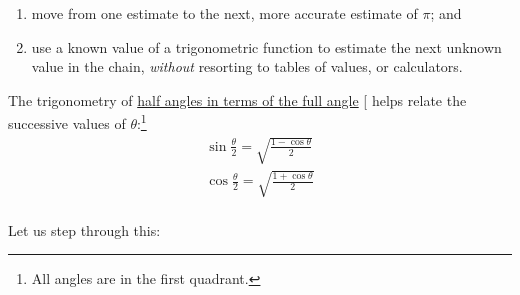 \documentclass[
  a4paper,
]{article}
\begin{document}
\begin{enumerate}
\def\labelenumi{\alph{enumi}.}
\item
  move from one estimate to the next, more accurate estimate of \(\pi\);
  and
\item
  use a known value of a trigonometric function to estimate the next
  unknown value in the chain, \emph{without} resorting to tables of
  values, or calculators.
\end{enumerate}

The trigonometry of
\href{https://math.libretexts.org/Bookshelves/Algebra/Algebra_and_Trigonometry_1e_(OpenStax)/09:_Trigonometric_Identities_and_Equations/9.03:_Double-Angle_Half-Angle_and_Reduction_Formulas}{half
angles in terms of the full angle} {[}\citeproc{ref-half-angle}{5}{]}
helps relate the successive values of \(\theta\):\footnote{All angles
  are in the first quadrant.} \[
\begin{aligned}
\sin\frac{\theta}{2} = \sqrt{\frac{1 - \cos\theta}{2}}\\
\cos\frac{\theta}{2} = \sqrt{\frac{1 + \cos\theta}{2}}\\
\end{aligned}
\]

Let us step through this:
\end{document}
